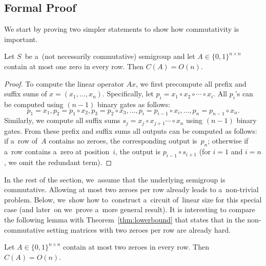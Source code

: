 \documentclass{toc}
\begin{document}
\subsection{Formal Proof}
We start by proving two simpler statements to show how commutativity is
important.

\begin{lemma}\label{lemma:easy}
Let $S$~be a~(not necessarily commutative) semigroup and let
$A \in \{0,1\}^{n \times n}$ contain at most
one zero in every row. Then
$C(A) = O(n)$.
\end{lemma}

\begin{proof}
To compute the linear operator $Ax$, we first
precompute all prefix and suffix sums of $x=(x_1, \dotsc, x_n)$.
Specifically, let $p_i=x_1 \circ x_2 \circ \dotsb \circ x_i$. All $p_i$'s can be
computed using $(n-1)$ binary gates as follows:
\[
p_1=x_1, p_2=p_1 \circ x_2, p_3=p_2 \circ x_3, \dotsc, p_i=p_{i-1} \circ x_i, \dotsc, p_n=p_{n-1}\circ x_n.
\]
Similarly, we compute all suffix sums
$s_j=x_j \circ x_{j+1} \dotsb \circ x_n$ using
$(n-1)$ binary gates. From these prefix and suffix sums
all outputs can be
computed as follows: if a~row of~$A$ contains no zeroes,
the corresponding
output is~$p_n$; otherwise if a~row contains a~zero at position~$i$, the
output is $p_{i-1} \circ s_{i+1}$ (for $i=1$ and $i=n$, we omit the redundant
term).
\end{proof}

In the rest of the section, we~assume that the
underlying semigroup is
commutative. Allowing at most two zeroes per row already leads to a~non-trivial
problem.
Below, we~show how to~construct a~circuit of~linear size for
this special case (and later~on we~prove a~more general result).
It is interesting to compare the following lemma
with Theorem~\ref{thm:lowerbound} that states that in the
non-commutative setting matrices with two zeroes per row are already hard.

\begin{lemma} \label{lem:at_most_2}
Let $A \in \{0,1\}^{n \times n}$ contain at most two zeroes in every row. Then
$C(A) = O(n)$.
\end{lemma}

\end{document}
